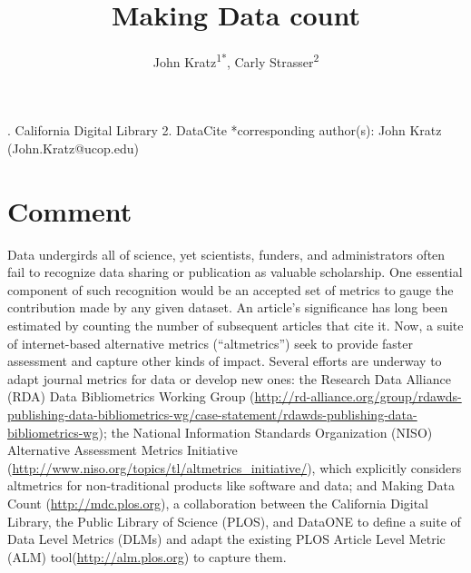 \documentclass[english]{article}
\begin{document}
\title{Making Data count}


\author{John Kratz\textsuperscript{1{*}}, Carly Strasser\textsuperscript{2}}

. California Digital Library 2. DataCite 
{*}corresponding author(s): John Kratz (John.Kratz@ucop.edu)


\section*{Comment}


Data undergirds all of science, yet scientists, funders, and administrators often fail to recognize data sharing or publication as valuable scholarship.
One essential component of such recognition would be an accepted set of metrics to gauge the contribution made by any given dataset.
An article's significance has long been estimated by counting the number of subsequent articles that cite it. 
Now, a suite of internet-based alternative metrics (``altmetrics'') seek to provide faster assessment and capture other kinds of impact\cite{priem_altmetrics_2012}.
Several efforts are underway to adapt journal metrics for data or develop new ones: the Research Data Alliance (RDA) Data Bibliometrics Working Group (\url{http://rd-alliance.org/group/rdawds-publishing-data-bibliometrics-wg/case-statement/rdawds-publishing-data-bibliometrics-wg}{}); the National Information Standards Organization (NISO) Alternative Assessment Metrics Initiative (\url{http://www.niso.org/topics/tl/altmetrics_initiative/}), which explicitly considers altmetrics for non-traditional products like software and data; and Making Data Count (\url{http://mdc.plos.org}), a collaboration between the California Digital Library, the Public Library of Science (PLOS), and DataONE to define a suite of Data Level Metrics (DLMs) and adapt the existing PLOS Article Level Metric (ALM) tool(\url{http://alm.plos.org}) to capture them.

\end{document}
